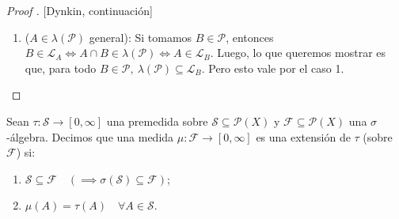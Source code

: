 \begin{proof}[Proof ][Dynkin, continuación]
\begin{enumerate}
		\item ($A \in \lambda(\mathcal{P})$ general): Si tomamos $B \in \mathcal{P}$, entonces $B \in \mathscr{L}_A \iff A \cap B \in \lambda(\mathscr{P}) \iff A \in \mathscr{L}_B$. Luego, lo que queremos mostrar es que, para todo $B \in \mathcal{P},\ \lambda(\mathcal{P}) \subseteq \mathscr{L}_B$. Pero esto vale por el caso 1. \checkmark
	\end{enumerate}
\end{proof}

\begin{definition}
	Sean $\tau : \mathscr{S} \to [0,\infty]$ una premedida sobre $\mathscr{S} \subseteq \mathcal{P}(X)$ y $\mathcal{F} \subseteq \mathcal{P}(X)$ una $\sigma$-álgebra. Decimos que una medida $\mu: \mathcal{F} \to [0,\infty]$ es una extensión de $\tau$ (sobre $\mathcal{F}$) si:
	\begin{enumerate}
		\item $\mathscr{S} \subseteq \mathcal{F} \quad (\implies \sigma(\mathscr{S}) \subseteq \mathcal{F})$;

		\item $\mu(A) = \tau(A) \quad \forall A \in \mathscr{S}$.
	\end{enumerate}
\end{definition}

